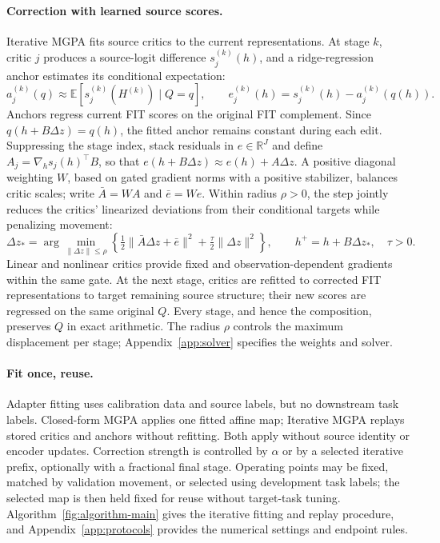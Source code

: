 \documentclass{article}
\theoremstyle{plain}
\theoremstyle{definition}
\newcommand{\R}{\mathbb R}
\newcommand{\E}{\mathbb E}
\begin{document}
\paragraph{Correction with learned source scores.}
\label{sec:mgpa-iter}
Iterative MGPA fits source critics to the current representations. At stage
$k$, critic $j$ produces a source-logit difference $s_j^{(k)}(h)$, and a
ridge-regression anchor estimates its conditional expectation:
\begin{equation}
 a_j^{(k)}(q)\approx\E[s_j^{(k)}(H^{(k)})\mid Q=q],\qquad
 e_j^{(k)}(h)=s_j^{(k)}(h)-a_j^{(k)}(q(h)).
 \label{eq:targets}
\end{equation}
Anchors regress current FIT scores on the original FIT complement. Since
$q(h+B\Delta z)=q(h)$, the fitted anchor remains constant during each edit.
Suppressing the stage index, stack residuals in $e\in\R^J$ and define
$A_j=\nabla_hs_j(h)^\top B$, so that
$e(h+B\Delta z)\approx e(h)+A\Delta z$.
A positive diagonal weighting $W$, based on gated gradient norms with a
positive stabilizer, balances critic scales; write $\bar A=WA$ and $\bar e=We$.
Within radius $\rho>0$, the step jointly reduces the critics' linearized
deviations from their conditional targets while penalizing movement:
\begin{equation}
 \Delta z_* = \arg\min_{\|\Delta z\|\le\rho}
 \left\{\tfrac12\|\bar A\Delta z+\bar e\|^2
 +\tfrac\tau2\|\Delta z\|^2\right\},
 \qquad h^+=h+B\Delta z_*,\quad\tau>0.
 \label{eq:tr-problem}
\end{equation}
Linear and nonlinear critics provide fixed and observation-dependent
gradients within the same gate. At the next stage, critics are refitted to
corrected FIT representations to target remaining source structure; their
new scores are regressed on the same original $Q$. Every stage, and hence
the composition, preserves $Q$ in exact
arithmetic. The radius $\rho$ controls the maximum displacement per stage;
Appendix~\ref{app:solver} specifies the weights and solver.

\paragraph{Fit once, reuse.}
Adapter fitting uses calibration data and source labels, but no downstream
task labels. Closed-form MGPA applies one fitted affine map; Iterative MGPA
replays stored critics and anchors without refitting. Both apply without
source identity or encoder updates.
Correction strength is controlled by $\alpha$ or by a selected iterative
prefix, optionally with a fractional final stage. Operating points may be
fixed, matched by validation movement, or selected using development task
labels; the selected map is then held fixed for reuse without target-task
tuning. Algorithm~\ref{fig:algorithm-main} gives the iterative fitting and
replay procedure, and Appendix~\ref{app:protocols} provides the numerical
settings and endpoint rules.

\end{document}

